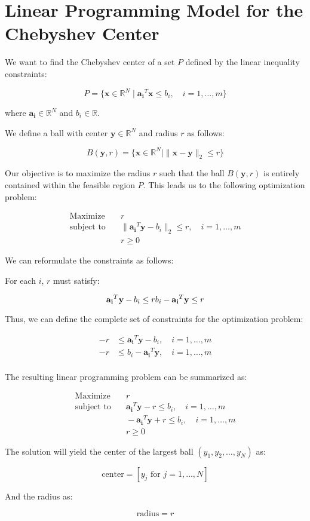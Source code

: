 \documentclass{article}
\begin{document}
\section*{Linear Programming Model for the Chebyshev Center}

We want to find the Chebyshev center of a set \( P \) defined by the linear inequality constraints:

\[
P = \{ \mathbf{x} \in \mathbb{R}^{N} \mid \mathbf{a_i}^T \mathbf{x} \leq b_i, \quad i = 1, \ldots, m \}
\]

where \( \mathbf{a_i} \in \mathbb{R}^{N} \) and \( b_i \in \mathbb{R} \).

We define a ball with center \( \mathbf{y} \in \mathbb{R}^{N} \) and radius \( r \) as follows:

\[
B(\mathbf{y}, r) = \{ \mathbf{x} \in \mathbb{R}^{N} \mid \|\mathbf{x} - \mathbf{y}\|_2 \leq r \}
\]

Our objective is to maximize the radius \( r \) such that the ball \( B(\mathbf{y}, r) \) is entirely contained within the feasible region \( P \). This leads us to the following optimization problem:

\[
\begin{align*}
\text{Maximize} & \quad r \\
\text{subject to} & \quad \|\mathbf{a_i}^T \mathbf{y} - b_i\|_2 \leq r, \quad i = 1, \ldots, m \\
& \quad r \geq 0
\end{align*}
\]

We can reformulate the constraints as follows:

For each \( i \), \( r \) must satisfy:

\[
\mathbf{a_i}^T \mathbf{y} - b_i \leq r \\
b_i - \mathbf{a_i}^T \mathbf{y} \leq r
\]

Thus, we can define the complete set of constraints for the optimization problem:

\[
\begin{align*}
-r & \leq \mathbf{a_i}^T \mathbf{y} - b_i, \quad i = 1, \ldots, m \\
-r & \leq b_i - \mathbf{a_i}^T \mathbf{y}, \quad i = 1, \ldots, m \\
\end{align*}
\]

The resulting linear programming problem can be summarized as:

\[
\begin{align*}
\text{Maximize} & \quad r \\
\text{subject to} & \quad \mathbf{a_i}^T \mathbf{y} - r \leq b_i, \quad i = 1, \ldots, m \\
& \quad -\mathbf{a_i}^T \mathbf{y} + r \leq b_i, \quad i = 1, \ldots, m \\
& \quad r \geq 0
\end{align*}
\]

The solution will yield the center of the largest ball \( (y_1, y_2, \ldots, y_N) \) as:

\[
\text{center} = [y_j \text{ for } j = 1, \ldots, N]
\]

And the radius as:

\[
\text{radius} = r
\]
\end{document}
